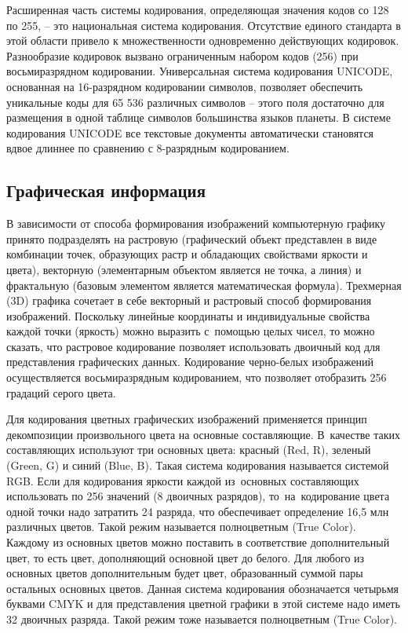 \documentclass{ou}
\begin{document}
Расширенная часть системы кодирования, определяющая значения кодов со 128 по 255, -- это национальная система кодирования. Отсутствие единого стандарта в этой области привело к множественности одновременно действующих кодировок. Разнообразие кодировок вызвано ограниченным набором кодов (256) при восьмиразрядном кодировании. Универсальная система кодирования UNICODE, основанная на 16-разрядном кодировании символов, позволяет обеспечить уникальные коды для 65 536 различных символов -- этого поля достаточно для размещения в одной таблице символов большинства языков планеты. В системе кодирования UNICODE все текстовые документы автоматически становятся вдвое длиннее по сравнению с 8-разрядным кодированием. 
\subsection{Графическая информация}
В зависимости от способа формирования изображений компьютерную графику принято подразделять на растровую (графический объект представлен в виде комбинации точек, образующих растр и обладающих свойствами яркости и цвета), векторную (элементарным объектом является не точка, а линия) и фрактальную (базовым элементом является математическая формула). Трехмерная (3D) графика сочетает в себе векторный и растровый способ формирования изображений. Поскольку линейные координаты и индивидуальные свойства каждой точки (яркость) можно выразить с~помощью целых чисел, то можно сказать, что растровое кодирование позволяет использовать двоичный код для представления графических данных. Кодирование черно-белых изображений осуществляется восьмиразрядным кодированием, что позволяет отобразить 256 градаций серого цвета. 

Для кодирования цветных графических изображений применяется принцип декомпозиции произвольного цвета на основные составляющие. В~качестве таких составляющих используют три основных цвета: красный (Red, R), зеленый (Green, G) и синий (Blue, B). Такая система кодирования называется системой RGB. Если для кодирования яркости каждой из~основных составляющих использовать по 256 значений (8 двоичных разрядов), то~на~кодирование цвета одной точки надо затратить 24 разряда, что обеспечивает определение 16,5 млн различных цветов. Такой режим называется полноцветным (True Color). Каждому из основных цветов можно поставить в соответствие дополнительный цвет, то есть цвет, дополняющий основной цвет до белого. Для любого из основных цветов дополнительным будет цвет, образованный суммой пары остальных основных цветов. Данная система кодирования обозначается четырьмя буквами CMYK и для представления цветной графики в этой системе надо иметь 32 двоичных разряда. Такой режим тоже называется полноцветным (True Color). 
\end{document}
